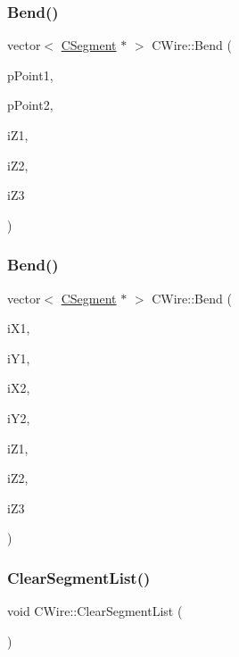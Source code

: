 \mbox{\label{classCWire_a5e7f3f872777c728db89921f49bef82c}} 
\subsubsection{\texorpdfstring{Bend()}{Bend()}\hspace{0.1cm}{\footnotesize\ttfamily [4/5]}}
{\footnotesize\ttfamily vector$<$ \mbox{\hyperlink{classCSegment}{C\+Segment}} $\ast$ $>$ C\+Wire\+::\+Bend (\begin{DoxyParamCaption}\item[{\mbox{\hyperlink{classCPoint}{C\+Point}} $\ast$}]{p\+Point1,  }\item[{\mbox{\hyperlink{classCPoint}{C\+Point}} $\ast$}]{p\+Point2,  }\item[{int}]{i\+Z1,  }\item[{int}]{i\+Z2,  }\item[{int}]{i\+Z3 }\end{DoxyParamCaption})}

\mbox{\label{classCWire_a1ffc3243c96850451394c2b121705585}} 
\subsubsection{\texorpdfstring{Bend()}{Bend()}\hspace{0.1cm}{\footnotesize\ttfamily [5/5]}}
{\footnotesize\ttfamily vector$<$ \mbox{\hyperlink{classCSegment}{C\+Segment}} $\ast$ $>$ C\+Wire\+::\+Bend (\begin{DoxyParamCaption}\item[{int}]{i\+X1,  }\item[{int}]{i\+Y1,  }\item[{int}]{i\+X2,  }\item[{int}]{i\+Y2,  }\item[{int}]{i\+Z1,  }\item[{int}]{i\+Z2,  }\item[{int}]{i\+Z3 }\end{DoxyParamCaption})}

\mbox{\label{classCWire_a1d2f3795ad3fb276a22eaf5a10b89a36}} 
\subsubsection{\texorpdfstring{ClearSegmentList()}{ClearSegmentList()}}
{\footnotesize\ttfamily void C\+Wire\+::\+Clear\+Segment\+List (\begin{DoxyParamCaption}{ }\end{DoxyParamCaption})}


